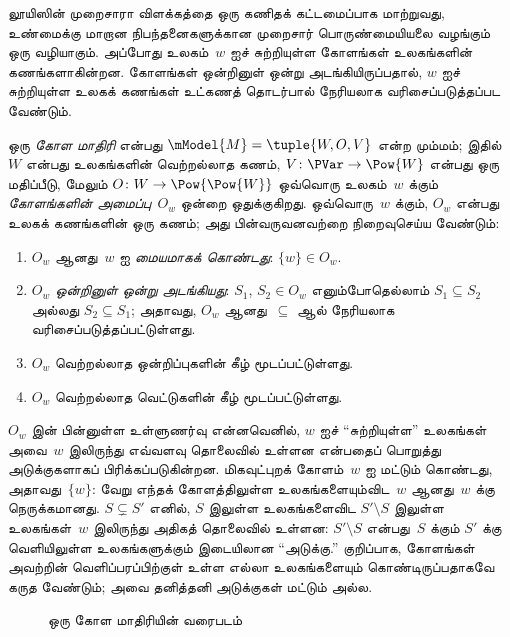 \documentclass[../../../include/open-logic-section]{subfiles}
\begin{document}


லூயிஸின் முறைசாரா விளக்கத்தை ஒரு கணிதக் கட்டமைப்பாக மாற்றுவது,
உண்மைக்கு மாறான நிபந்தனைகளுக்கான முறைசார் பொருண்மையியலை வழங்கும் ஒரு
வழியாகும். அப்போது உலகம்~$w$ ஐச் சுற்றியுள்ள கோளங்கள் உலகங்களின்
கணங்களாகின்றன. கோளங்கள் ஒன்றினுள் ஒன்று அடங்கியிருப்பதால், $w$ ஐச்
சுற்றியுள்ள உலகக் கணங்கள் உட்கணத் தொடர்பால் நேரியலாக வரிசைப்படுத்தப்பட
வேண்டும்.

\begin{defn}
  ஒரு \emph{கோள மாதிரி} என்பது $\mModel{M} = \tuple{W, O, V}$ என்ற
  மும்மம்; இதில் $W$ என்பது உலகங்களின் வெற்றல்லாத கணம், $V\colon \PVar
  \to \Pow{W}$ என்பது ஒரு மதிப்பீடு, மேலும் $O\colon W \to
  \Pow{\Pow{W}}$ ஒவ்வொரு உலகம்~$w$ க்கும் \emph{கோளங்களின்
  அமைப்பு}~$O_w$ ஒன்றை ஒதுக்குகிறது. ஒவ்வொரு~$w$ க்கும், $O_w$ என்பது
  உலகக் கணங்களின் ஒரு கணம்; அது பின்வருவனவற்றை நிறைவுசெய்ய வேண்டும்:
  \begin{enumerate}
  \item $O_w$ ஆனது~$w$ ஐ \emph{மையமாகக் கொண்டது}: $\{w\} \in O_w$.
  \item $O_w$ \emph{ஒன்றினுள் ஒன்று அடங்கியது}: $S_1$, $S_2 \in O_w$
    எனும்போதெல்லாம் $S_1 \subseteq S_2$ அல்லது $S_2 \subseteq S_1$;
    அதாவது, $O_w$ ஆனது~$\subseteq$ ஆல் நேரியலாக வரிசைப்படுத்தப்பட்டுள்ளது.
  \item $O_w$ வெற்றல்லாத ஒன்றிப்புகளின் கீழ் மூடப்பட்டுள்ளது.
  \item $O_w$ வெற்றல்லாத வெட்டுகளின் கீழ் மூடப்பட்டுள்ளது.
  \end{enumerate}
\end{defn}

$O_w$ இன் பின்னுள்ள உள்ளுணர்வு என்னவெனில், $w$ ஐச் ``சுற்றியுள்ள''
உலகங்கள் அவை~$w$ இலிருந்து எவ்வளவு தொலைவில் உள்ளன என்பதைப் பொறுத்து
அடுக்குகளாகப் பிரிக்கப்படுகின்றன. மிகவுட்புறக் கோளம்~$w$ ஐ மட்டும்
கொண்டது, அதாவது~$\{w\}$: வேறு எந்தக் கோளத்திலுள்ள உலகங்களையும்விட~$w$
ஆனது~$w$ க்கு நெருக்கமானது. $S \subsetneq S'$ எனில், $S$ இலுள்ள உலகங்களைவிட
$S' \setminus S$ இலுள்ள உலகங்கள்~$w$ இலிருந்து அதிகத் தொலைவில் உள்ளன:
$S' \setminus S$ என்பது~$S$ க்கும் $S'$ க்கு வெளியிலுள்ள உலகங்களுக்கும்
இடையிலான ``அடுக்கு.'' குறிப்பாக, கோளங்கள் அவற்றின் வெளிப்பரப்பிற்குள்
உள்ள எல்லா உலகங்களையும் கொண்டிருப்பதாகவே கருத வேண்டும்; அவை தனித்தனி
அடுக்குகள் மட்டும் அல்ல.

\begin{figure}
\begin{center}
\caption{ஒரு கோள மாதிரியின் வரைபடம்}
\end{center}
\end{figure}
\end{document}
